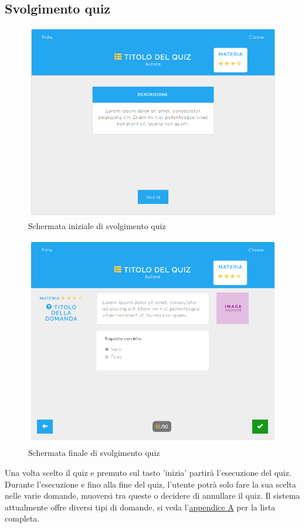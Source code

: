 \documentclass[a4paper, titlepage]{article}
\begin{document}
	 \subsection{Svolgimento quiz}
	 \begin{figure}[!h]
	 	\centering
	 	\includegraphics[scale=0.33]{Img/screen_SvolgimentoQuiz1.png}
	 	\caption{Schermata iniziale di svolgimento quiz}
	 \end{figure}
	 \begin{figure}[!h]
	 	\centering
	 	\includegraphics[scale=0.33]{Img/screen_SvolgimentoQuiz3.png}
	 	\caption{Schermata finale di svolgimento quiz}
	 \end{figure}
	 Una volta scelto il quiz e premuto sul tasto 'inizia' partirà l'esecuzione del quiz. Durante l'esecuzione e fino alla fine del quiz, l'utente potrà solo fare la sua scelta nelle varie domande, muoversi tra queste o decidere di annullare il quiz. Il sistema attualmente offre diversi tipi di domande, si veda l'\hyperref[domande]{appendice A} per la lista completa.
	 
\end{document}
